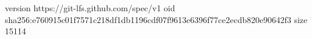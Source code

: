 version https://git-lfs.github.com/spec/v1
oid sha256:e760915c01f7571c218df1db1196cdf07f9613e6396f77ce2ecdb820e90642f3
size 15114
